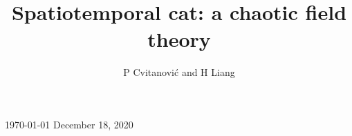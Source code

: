 \documentclass[12pt]{iopart}
\begin{document}
\title[Spatiotemporal cat]
{Spatiotemporal cat: a chaotic field theory} %

    \author{
P Cvitanovi{\'c}
         and
H Liang
    }\address{
Center for Nonlinear Science, School of Physics,
            Georgia Institute of Technology,
            Atlanta, GA 30332-0430, USA
    } 
    \vspace{10pt}
    \begin{indented}
    \item[]
    \ifboyscout\today\else
December 18, 2020
    \fi
    \end{indented}

    \begin{abstract}

    \end{abstract}



\submitto{\NL}
    \ifsubmission
\maketitle %
    \fi

\renewcommand{\statesp}{phase space}
\renewcommand{\Statesp}{Phase space}
\renewcommand{\stateDsp}{phase-space}
\renewcommand{\StateDsp}{Phase-space}


    \ifboyscout\clearpage\fi

    \ifboyscout\clearpage\fi


\renewcommand{\statesp}{state space}
\renewcommand{\Statesp}{State space}
\renewcommand{\stateDsp}{state-space}
\renewcommand{\StateDsp}{State-space}

    \ifboyscout\clearpage\fi

    \ifboyscout\clearpage\fi

    \ifboyscout\clearpage\fi

    \ifboyscout\clearpage\fi

\end{document}
